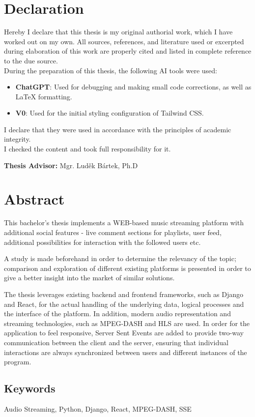 \section*{Declaration}
Hereby I declare that this thesis is my original authorial work, which I have worked out on my own. All
sources, references, and literature used or excerpted during elaboration of this work are properly cited and
listed in complete reference to the due source.
\\
During the preparation of this thesis, the following AI tools were used:

\begin{itemize}
    \item \textbf{ChatGPT}: Used for debugging and making small code corrections, as well as LaTeX formatting.
    \item \textbf{V0}: Used for the initial styling configuration of Tailwind CSS.
\end{itemize}

I declare that they were used in accordance with the principles of academic integrity.\\
I checked the content and took full responsibility for it.

\vfill\noindent
\textbf{Thesis Advisor:} Mgr. Luděk Bártek, Ph.D
\cleardoublepage

\section*{Abstract}
This bachelor's thesis implements a WEB-based music streaming platform
with additional social features - live comment sections for playlists,
user feed, additional possibilities for interaction with the followed users etc.

A study is made beforehand in order to determine the relevancy of the topic;
comparison and exploration of different existing platforms is presented in order
to give a better insight into the market of similar solutions.

The thesis leverages existing backend and frontend frameworks, such as Django and React, for the
actual handling of the underlying data, logical processes and the interface of the platform.
In addition, modern audio representation and streaming technologies,
such as MPEG-DASH and HLS are used.
In order for the application to feel responsive, Server Sent Events are added to provide
two-way communication between the client and the server, ensuring that
individual interactions are always synchronized between users and different instances of the program.


\subsection*{Keywords}
Audio Streaming, Python, Django, React, MPEG-DASH, SSE
